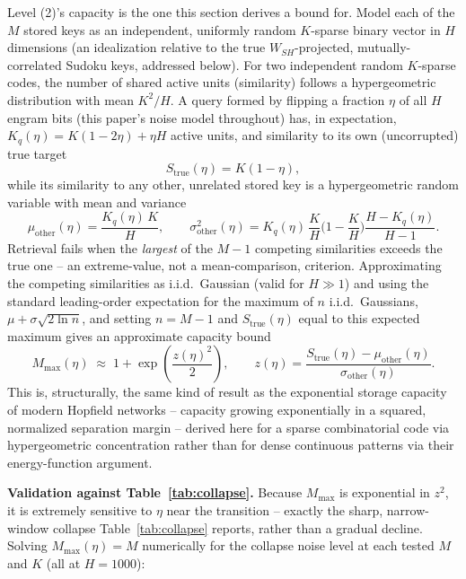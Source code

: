 \documentclass[11pt]{article}
\begin{document}
Level (2)'s capacity is the one this section derives a bound for. Model each of the $M$ stored
keys as an independent, uniformly random $K$-sparse binary vector in $H$ dimensions (an
idealization relative to the true $W_{SH}$-projected, mutually-correlated Sudoku keys, addressed
below). For two independent random $K$-sparse codes, the number of shared active units
(similarity) follows a hypergeometric distribution with mean $K^2/H$. A query formed by flipping
a fraction $\eta$ of all $H$ engram bits (this paper's noise model throughout) has, in
expectation, $K_q(\eta) = K(1-2\eta) + \eta H$ active units, and similarity to its own
(uncorrupted) true target
\begin{equation}
S_{\mathrm{true}}(\eta) = K(1-\eta),
\end{equation}
while its similarity to any other, unrelated stored key is a hypergeometric random variable with
mean and variance
\begin{equation}
\mu_{\mathrm{other}}(\eta) = \frac{K_q(\eta)\,K}{H}, \qquad
\sigma_{\mathrm{other}}^2(\eta) = K_q(\eta)\,\frac{K}{H}\Big(1-\frac{K}{H}\Big)\frac{H-K_q(\eta)}{H-1}.
\end{equation}
Retrieval fails when the \emph{largest} of the $M{-}1$ competing similarities exceeds the true
one -- an extreme-value, not a mean-comparison, criterion. Approximating the competing
similarities as i.i.d.\ Gaussian (valid for $H\gg1$) and using the standard leading-order
expectation for the maximum of $n$ i.i.d.\ Gaussians, $\mu+\sigma\sqrt{2\ln n}$, and setting
$n=M-1$ and $S_{\mathrm{true}}(\eta)$ equal to this expected maximum gives an approximate capacity
bound
\begin{equation}
M_{\max}(\eta) \;\approx\; 1 + \exp\!\left(\frac{z(\eta)^2}{2}\right), \qquad
z(\eta) = \frac{S_{\mathrm{true}}(\eta) - \mu_{\mathrm{other}}(\eta)}{\sigma_{\mathrm{other}}(\eta)}.
\label{eq:mmax-expected}
\end{equation}
This is, structurally, the same kind of result as the exponential storage capacity of modern
Hopfield networks \cite{ramsauer2020} -- capacity growing exponentially in a squared,
normalized separation margin -- derived here for a sparse combinatorial code via hypergeometric
concentration rather than for dense continuous patterns via their energy-function argument.

\textbf{Validation against Table~\ref{tab:collapse}.} Because $M_{\max}$ is exponential in
$z^2$, it is extremely sensitive to $\eta$ near the transition -- exactly the sharp,
narrow-window collapse Table~\ref{tab:collapse} reports, rather than a gradual decline.
Solving $M_{\max}(\eta)=M$ numerically for the collapse noise level at each tested $M$ and $K$
(all at $H{=}1000$):
\end{document}
